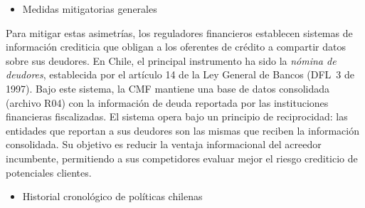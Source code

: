 \documentclass[11pt]{article}
\theoremstyle{plain}
\theoremstyle{plain}
\begin{document}
\begin{itemize}
    \item Medidas mitigatorias generales%
\end{itemize}
 
Para mitigar estas asimetrías, los reguladores financieros establecen sistemas de información crediticia que obligan a los oferentes de crédito a compartir datos sobre sus deudores. En Chile, el principal instrumento ha sido la \textit{nómina de deudores}, establecida por el artículo 14 de la Ley General de Bancos (DFL~3 de 1997). Bajo este sistema, la CMF mantiene una base de datos consolidada (archivo R04) con la información de deuda reportada por las instituciones financieras fiscalizadas. El sistema opera bajo un principio de reciprocidad: las entidades que reportan a sus deudores son las mismas que reciben la información consolidada. Su objetivo es reducir la ventaja informacional del acreedor incumbente, permitiendo a sus competidores evaluar mejor el riesgo crediticio de potenciales clientes.

\begin{itemize}
    \item Historial cronológico de políticas chilenas%
\end{itemize}   
\end{document}
